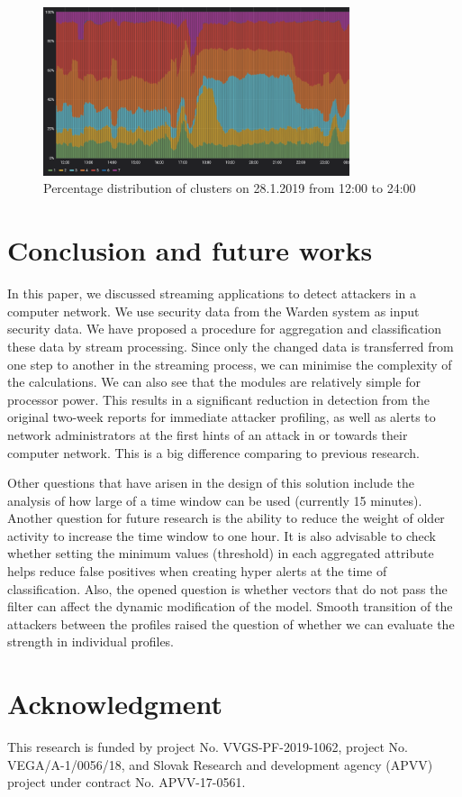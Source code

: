 \documentclass[conference, a4paper]{IEEEtran}
\begin{document}
\begin{figure}[htbp]
\centerline{\includegraphics[width=9cm]{images/fig5.png}}
\caption{Percentage distribution of clusters on 28.1.2019 from 12:00 to 24:00} 
\label{fig5}
\end{figure}


\section{Conclusion and future works}
In this paper, we discussed streaming applications to detect attackers in a computer network. We use security data from the Warden system as input security data. We have proposed a procedure for aggregation and classification these data by stream processing. Since only the changed data is transferred from one step to another in the streaming process, we can minimise the complexity of the calculations. We can also see that the modules are relatively simple for processor power. This results in a significant reduction in detection from the original two-week reports for immediate attacker profiling, as well as alerts to network administrators at the first hints of an attack in or towards their computer network. This is a big difference comparing to previous research.

Other questions that have arisen in the design of this solution include the analysis of how large of a time window can be used (currently 15 minutes). Another question for future research is the ability to reduce the weight of older activity to increase the time window to one hour. It is also advisable to check whether setting the minimum values (threshold) in each aggregated attribute helps reduce false positives when creating hyper alerts at the time of classification. Also, the opened question is whether vectors that do not pass the filter can affect the dynamic modification of the model. Smooth transition of the attackers between the profiles raised the question of whether we can evaluate the strength in individual profiles.

\section*{Acknowledgment}
This research is funded by project No. VVGS-PF-2019-1062, project No. VEGA/A-1/0056/18, and Slovak Research and development agency (APVV) project under contract No. APVV-17-0561.



\end{document}
